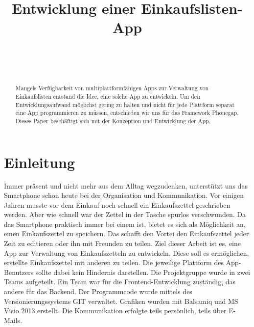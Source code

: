 \documentclass[10pt, conference, compsocconf]{IEEEtran}
\begin{document}
\title{Entwicklung einer Einkaufslisten-App}


\author{
\\
\and
{}
\\
}

\maketitle


\begin{abstract}
Mangels Verf\"ugbarkeit von multiplattformf\"ahigen Apps zur Verwaltung von Einkaufslisten entstand die Idee, eine solche App zu entwickeln. Um den Entwicklungsaufwand m\"oglichst gering zu halten und nicht f\"ur jede Plattform separat eine App programmieren zu müssen, entschieden wir uns f\"ur das Framework Phonegap. Dieses Paper besch\"aftigt sich mit der Konzeption und Entwicklung der App.   
\end{abstract}

\IEEEpeerreviewmaketitle

\section{Einleitung}
Immer pr\"asent und nicht mehr aus dem Alltag wegzudenken, unterst\"utzt  uns das Smartphone schon heute bei der Organisation und Kommunikation. 
Vor einigen Jahren musste vor dem Einkauf noch schnell ein Einkaufszettel geschrieben werden. 
Aber wie schnell war der Zettel  in der Tasche spurlos verschwunden. 
Da das Smartphone praktisch immer bei einem ist, bietet es sich als M\"oglichkeit an, einen Einkaufszettel zu speichern. 
Das schafft den Vortei den Einkaufszettel jeder Zeit zu editieren oder ihn mit Freunden zu teilen. 
Ziel dieser Arbeit ist es, eine App zur Verwaltung von Einkaufszetteln zu entwickeln.
Diese soll es erm\"oglichen, erstellte Einkaufszettel mit anderen zu teilen.
Die jeweilige Plattform des App-Benutzers sollte dabei kein Hindernis darstellen.
Die Projektgruppe wurde in zwei Teams aufgeteilt. 
Ein Team war f\"ur die Frontend-Entwicklung zust\"andig, das andere f\"ur das Backend. 
Der Programmcode wurde mittels des Versionierungssystems GIT verwaltet. 
Grafiken wurden mit Balsamiq und MS Visio 2013 erstellt. 
Die Kommunikation erfolgte teils pers\"onlich, teils \"uber E-Mails.
\end{document}
